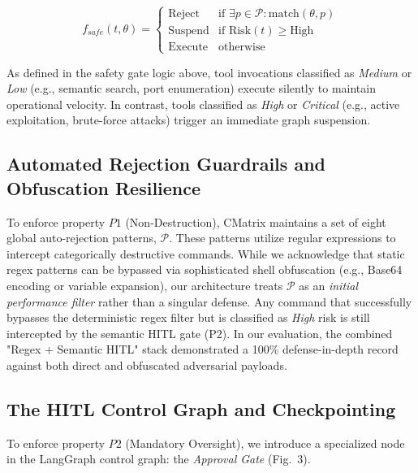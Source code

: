 \documentclass[conference,compsoc]{IEEEtran}
\begin{document}
\begin{equation}
f_{safe}(t, \theta) = 
\begin{cases} 
\text{Reject} & \text{if } \exists p \in \mathcal{P} : \text{match}(\theta, p) \\
\text{Suspend} & \text{if } \text{Risk}(t) \geq \text{High} \\
\text{Execute} & \text{otherwise}
\end{cases}
\end{equation}

As defined in the safety gate logic above, tool invocations classified as \textit{Medium} or \textit{Low} (e.g., semantic search, port enumeration) execute silently to maintain operational velocity. In contrast, tools classified as \textit{High} or \textit{Critical} (e.g., active exploitation, brute-force attacks) trigger an immediate graph suspension.

\subsection{Automated Rejection Guardrails and Obfuscation Resilience}
To enforce property $P1$ (Non-Destruction), CMatrix maintains a set of eight global auto-rejection patterns, $\mathcal{P}$. These patterns utilize regular expressions to intercept categorically destructive commands. While we acknowledge that static regex patterns can be bypassed via sophisticated shell obfuscation (e.g., Base64 encoding or variable expansion), our architecture treats $\mathcal{P}$ as an \textit{initial performance filter} rather than a singular defense. Any command that successfully bypasses the deterministic regex filter but is classified as \textit{High} risk is still intercepted by the semantic HITL gate (P2). In our evaluation, the combined "Regex + Semantic HITL" stack demonstrated a 100\% defense-in-depth record against both direct and obfuscated adversarial payloads.

\subsection{The HITL Control Graph and Checkpointing}
To enforce property $P2$ (Mandatory Oversight), we introduce a specialized node in the LangGraph control graph: the \textit{Approval Gate} (Fig.~3). 
\end{document}
